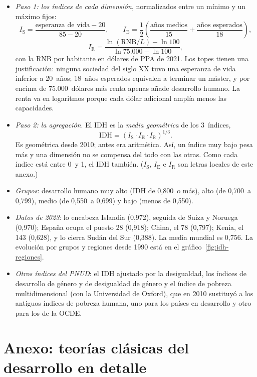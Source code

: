 \documentclass[11pt]{article}
\begin{document}
\begin{itemize}
\item \emph{Paso 1: los índices de cada dimensión}, normalizados entre un mínimo y un máximo fijos\nocite{PNUD2025NotasTecnicas}:
  \[
  I_{\mathrm{S}}=\frac{\text{esperanza de vida}-20}{85-20},\qquad
  I_{\mathrm{E}}=\frac{1}{2}\left(\frac{\text{años medios}}{15}+\frac{\text{años esperados}}{18}\right),
  \]
  \[
  I_{\mathrm{R}}=\frac{\ln(\mathrm{RNB}/L)-\ln 100}{\ln 75.000-\ln 100},
  \]
  con la RNB por habitante en dólares de PPA de 2021. Los topes tienen una justificación: ninguna sociedad del siglo XX tuvo una esperanza de vida inferior a 20~años; 18~años esperados equivalen a terminar un máster, y por encima de 75.000~dólares más renta apenas añade desarrollo humano. La renta va en logaritmos porque cada dólar adicional amplía menos las capacidades.
\item \emph{Paso 2: la agregación}. El IDH es la \emph{media geométrica} de los 3~índices,
  \[
  \mathrm{IDH}=\left(I_{\mathrm{S}}\cdot I_{\mathrm{E}}\cdot I_{\mathrm{R}}\right)^{1/3}.
  \]
  Es geométrica desde 2010\nocite{PNUD2010IDH}; antes era aritmética. Así, un índice muy bajo pesa más y una dimensión no se compensa del todo con las otras. Como cada índice está entre 0~y 1, el IDH también. ($I_{\mathrm{S}}$, $I_{\mathrm{E}}$ e $I_{\mathrm{R}}$ son letras locales de este anexo.)
\item \emph{Grupos}: desarrollo humano muy alto (IDH de 0,800~o más), alto (de 0,700~a 0,799), medio (de 0,550~a 0,699) y bajo (menos de 0,550).
\item \emph{Datos de 2023}: lo encabeza Islandia (0,972), seguida de Suiza y Noruega (0,970); España ocupa el puesto 28 (0,918); China, el 78 (0,797); Kenia, el 143 (0,628), y lo cierra Sudán del Sur (0,388). La media mundial es 0,756\nocite{PNUD2025IDH}. La evolución por grupos y regiones desde 1990 está en el gráfico~\ref{fig:idh-regiones}.
\item \emph{Otros índices del PNUD}: el IDH ajustado por la desigualdad, los índices de desarrollo de género y de desigualdad de género y el índice de pobreza multidimensional (con la Universidad de Oxford), que en 2010 sustituyó a los antiguos índices de pobreza humana, uno para los países en desarrollo y otro para los de la OCDE\nocite{PNUD2010IDH}.
\end{itemize}

\section{Anexo: teorías clásicas del desarrollo en detalle}\label{anexo:clasicas}
\end{document}
